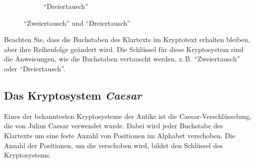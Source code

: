 \begin{myexercise}
\begin{myanswer}
\begin{figure}[H]
\begin{subfigure}[b]{0.48\textwidth}
				\caption{\enquote{Dreiertausch}}
			\end{subfigure}
			\caption{\enquote{Zweiertausch} und \enquote{Dreiertausch}}
			\label{fig:transposition-cipher}
		\end{figure}
		Beachten Sie, dass die Buchstaben des Klartexts im Kryptotext erhalten bleiben, aber ihre Reihenfolge geändert wird.
		Die Schlüssel für diese Kryptosystem sind die Anweisungen, wie die Buchstaben vertauscht werden, z.\,B. \enquote{Zweiertausch} oder \enquote{Dreiertausch}.
	\end{myanswer}
\end{myexercise}


\subsection{Das Kryptosystem \emph{Caesar}}
\label{subsec:caesar}
Eines der bekanntesten Kryptosysteme der Antike ist die Caesar-Verschlüsselung, die von Julius Caesar verwendet wurde.
Dabei wird jeder Buchstabe des Klartexts um eine feste Anzahl von Positionen im Alphabet verschoben.
Die Anzahl der Positionen, um die verschoben wird, bildet den Schlüssel des Kryptosystems.

